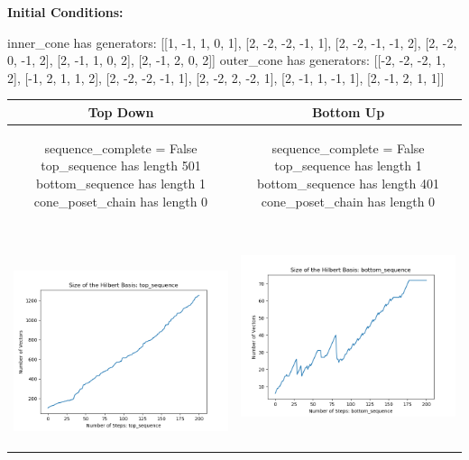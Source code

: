 \documentclass[10pt]{article}
\begin{document}
\textbf{Initial Conditions:}
\begin{SAGE}
inner_cone has generators: 
[[1, -1, 1, 0, 1], [2, -2, -2, -1, 1], [2, -2, -1, -1, 2], [2, -2, 0, -1, 2], [2, -1, 1, 0, 2], [2, -1, 2, 0, 2]]
outer_cone has generators: 
[[-2, -2, -2, 1, 2], [-1, 2, 1, 1, 2], [2, -2, -2, -1, 1], [2, -2, 2, -2, 1], [2, -1, 1, -1, 1], [2, -1, 2, 1, 1]]

\end{SAGE}
\begin{tabular}{c|c}
\textbf{Top Down} & \textbf{Bottom Up} \\ \hline  
\begin{SAGE}
	sequence_complete = False
	top_sequence has length 501
	bottom_sequence has length 1
	cone_poset_chain has length 0
\end{SAGE} 
&
\begin{SAGE}
	sequence_complete = False
	top_sequence has length 1
	bottom_sequence has length 401
	cone_poset_chain has length 0
\end{SAGE} 
\\ \hline
\
\begin{minipage}{.45\textwidth}
\includegraphics[width=\textwidth]{"DATA/5d/6 generators 2 bound A/top_sequence SIZE"}
\end{minipage} &
\begin{minipage}{.45\textwidth}
\includegraphics[width=\textwidth]{"DATA/5d/6 generators 2 bound A bottomup/bottom_sequence SIZE"}

\end{minipage}
\end{tabular}
\end{document}
